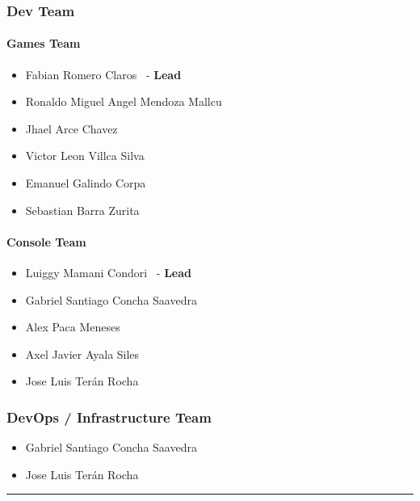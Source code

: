 \documentclass{article}
\providecommand{\tightlist}{
  \setlength{\itemsep}{0pt}\setlength{\parskip}{0pt}}
\begin{document}
\hypertarget{devteam-3}{
\subsubsection{\texorpdfstring{\textbf{Dev
Team}}{Dev Team}}\label{devteam-3}}

\paragraph{Games Team}\label{games-team-3}

\begin{itemize}
\tightlist
\item
  Fabian Romero Claros ~-
  \textbf{Lead}
\item
  Ronaldo Miguel Angel Mendoza Mallcu
\item
  Jhael Arce Chavez
\item
  Victor Leon Villca Silva
\item
  Emanuel Galindo Corpa
\item
  Sebastian Barra Zurita
\end{itemize}

\paragraph{Console Team}\label{console-team-3}

\begin{itemize}
\tightlist
\item
  Luiggy Mamani Condori ~- \textbf{Lead}
\item
  Gabriel Santiago Concha Saavedra
\item
  Alex Paca Meneses
\item
  Axel Javier Ayala Siles
\item
  Jose Luis Terán Rocha
\end{itemize}

\subsubsection{DevOps / Infrastructure Team}\label{devops-team-3}

\begin{itemize}
\tightlist
\item
  Gabriel Santiago Concha Saavedra
\item
  Jose Luis Terán Rocha
\end{itemize}

\begin{center}\rule{0.5\linewidth}{0.5pt}\end{center}
\end{document}
